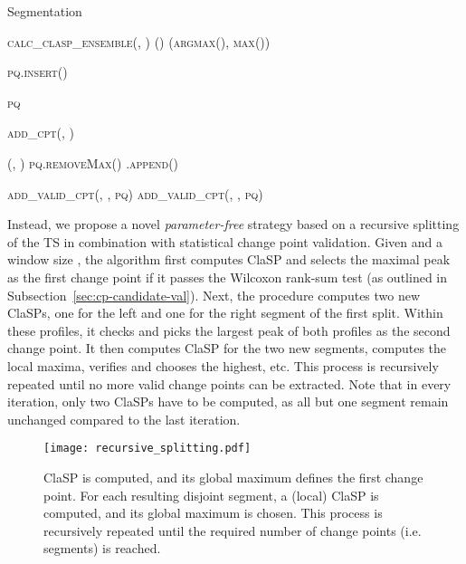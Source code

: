 \documentclass[pdflatex,sn-basic]{sn-jnl}
\begin{document}
\begin{algorithm}[t]
	\caption{Segmentation}\label{alg:recsplit}
	\begin{algorithmic}[1]
  
    	    \State   \textsc{calc\_clasp\_ensemble(, )}
    	    \State ()  (\textsc{argmax}(), \textsc{max}())
    	    
    		 
        	    \State \textsc{pq.insert}()
    	    \EndIf
    	\EndProcedure
    	
		\State   {}
		\State \textsc{pq}  
	
		\State \textsc{add\_cpt}(, )

		 
			\State (, )  \textsc{pq.removeMax()}
			\State .\textsc{append}() 
			
			\State  {}
			\State 
			
			\State \textsc{add\_valid\_cpt}(, , \textsc{pq}) 
			\State \textsc{add\_valid\_cpt}(, , \textsc{pq})
		\EndWhile
		\State \Return{}
		\EndProcedure
	\end{algorithmic}
\end{algorithm}

Instead, we propose a novel \emph{parameter-free} strategy based on a recursive splitting of the TS in combination with statistical change point validation. Given  and a window size , the algorithm first computes ClaSP and selects the maximal peak as the first change point if it passes the Wilcoxon rank-sum test (as outlined in Subsection~\ref{sec:cp-candidate-val}). Next, the procedure computes two new ClaSPs, one for the left and one for the right segment of the first split. Within these profiles, it checks and picks the largest peak of both profiles as the second change point. It then computes ClaSP for the two new segments, computes the local maxima, verifies and chooses the highest, etc. This process is recursively repeated until no more valid change points can be extracted. Note that in every iteration, only two ClaSPs have to be computed, as all but one segment remain unchanged compared to the last iteration.

\begin{figure}[t]
	\texttt{[image: recursive\_splitting.pdf]}
	\caption{ClaSP is computed, and its global maximum defines the first change point. For each resulting disjoint segment, a (local) ClaSP is computed, and its global maximum is chosen. This process is recursively repeated until the required number of change points (i.e. segments) is reached. \label{fig:ClaSP_recursive_split}
	}
\end{figure}
\end{document}
